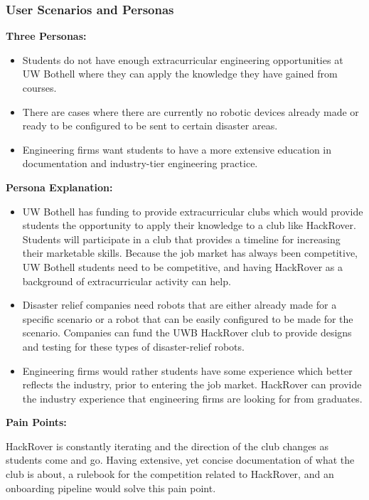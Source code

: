 \documentclass[a4paper, 10pt]{article}
\begin{document}
		\subsubsection{User Scenarios and Personas}
		\textbf{Three Personas:}
		
		\begin{itemize}
			\item
			Students do not have enough extracurricular engineering opportunities at UW Bothell where they can apply the knowledge they have gained from courses.
			
			\item
			There are cases where there are currently no robotic devices already made or ready to be configured to be sent to certain disaster areas.
			
			\item
			Engineering firms want students to have a more extensive education in documentation and industry-tier engineering practice.
		\end{itemize}
		
\textbf{Persona Explanation:}

\begin{itemize}
\item
UW Bothell has funding to provide extracurricular clubs which would provide students the opportunity to apply their knowledge to a club like HackRover. Students will participate in a club that provides a timeline for increasing their marketable skills. Because the job market has always been competitive, UW Bothell students need to be competitive, and having HackRover as a background of extracurricular activity can help.

\item
Disaster relief companies need robots that are either already made for a specific scenario or a robot that can be easily configured to be made for the scenario. Companies can fund the UWB HackRover club to provide designs and testing for these types of disaster-relief robots.

\item
Engineering firms would rather students have some experience which better reflects the industry, prior to entering the job market. HackRover can provide the industry experience that engineering firms are looking for from graduates. 
\end{itemize}

\textbf{Pain Points:}

HackRover is constantly iterating and the direction of the club changes as students come and go. Having extensive, yet concise documentation of what the club is about, a rulebook for the competition related to HackRover, and an onboarding pipeline would solve this pain point. \\
\end{document}
